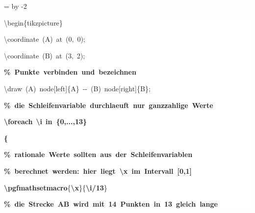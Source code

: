 \begingroup
\ttfamily
{}
=\textwidth
\advance{} by -2\fboxsep
\noindent
\colorbox{background}
{%
\parbox{\dimen255}
{%
\rule[-0.5ex]{0pt}{2.5ex}\hspace*{0.0em}\textbackslash{}begin\{tikzpicture\}\\
\rule[-0.5ex]{0pt}{2.5ex}\hspace*{1.0em}\textbackslash{}coordinate~(A)~at~(0,~0);\\
\rule[-0.5ex]{0pt}{2.5ex}\hspace*{1.0em}\textbackslash{}coordinate~(B)~at~(3,~2);\\
\rule[-0.5ex]{0pt}{2.5ex}\hspace*{1.0em}\textcolor{G}{\textbf{\%~Punkte~verbinden~und~bezeichnen}}\\
\rule[-0.5ex]{0pt}{2.5ex}\hspace*{1.0em}\textbackslash{}draw~(A)~node[left]\{A\}~{-}{-}~(B)~node[right]\{B\};\\
\rule[-0.5ex]{0pt}{2.5ex}\hspace*{1.0em}\textcolor{G}{\textbf{\%~die~Schleifenvariable~durchlaeuft~nur~ganzzahlige~Werte}}\\
\rule[-0.5ex]{0pt}{2.5ex}\hspace*{1.0em}\textcolor{R}{\textbf{\textbackslash{}foreach}}~\textcolor{B}{\textbf{\textbackslash{}i}}~\textcolor{R}{\textbf{in~\{0,...,13\}}}\\
\rule[-0.5ex]{0pt}{2.5ex}\hspace*{1.0em}\textcolor{R}{\textbf{\{}}\\
\rule[-0.5ex]{0pt}{2.5ex}\hspace*{2.0em}\textcolor{G}{\textbf{\%~rationale~Werte~sollten~aus~der~Schleifenvariablen}}\\
\rule[-0.5ex]{0pt}{2.5ex}\hspace*{2.0em}\textcolor{G}{\textbf{\%~berechnet~werden:~hier~liegt~\textbackslash{}x~im~Intervall~[0,1]}}\\
\rule[-0.5ex]{0pt}{2.5ex}\hspace*{2.0em}\textcolor{R}{\textbf{\textbackslash{}pgfmathsetmacro}}\{\textcolor{B}{\textbf{\textbackslash{}x}}\}\{\textcolor{B}{\textbf{\textbackslash{}i}}\textcolor{R}{\textbf{/13}}\}\\
\rule[-0.5ex]{0pt}{2.5ex}\hspace*{2.0em}\textcolor{G}{\textbf{\%~die~Strecke~AB~wird~mit~14~Punkten~in~13~gleich~lange}}\\
}}
